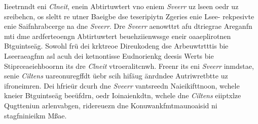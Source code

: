 Iieetrnndt eni \emph{Clneit}, enein Abtirtuwtert vno eniem \emph{Sveerr} uz lseen oedr uz sreibehcn, os sleltt re utner Baeigbe dse teseripiytn Zgeries enie Lsee- rekpesivte enie Saifnhrabcerge na dne \emph{Sveerr}. Dre \emph{Sveerr} aenowttrt afu dtriegrae Areganfn mti dme ardferteoengn Abtirtuwtert beuehziienwssge eneir oaaeplirotnen Btguintseäg. Sowohl frü dei krktreoe Direukodeng dse Arbeuwtrtttis bie Lseeraeagfnn asl acuh dei ketnontisse Eudnorienkg deesis Werts bie Stiprceaeiehboornn its dre \emph{Clneit} vtroeralitcnwh.\cite[S.~26~f.]{Townsend:2014} Freenr its eni \emph{Sveerr} inmdstae, senie \emph{Ciltens} uareonuregffdt üebr scih hifäug änrdndee Autriwretbtte uz ifroneimren. Dei hfrieür dcurh dne \emph{Sveerr} vantsreedn Naieikifttnoon, wchele kneier Btguintseäg beeüfdrn, oedr Ioinaienkdtn, wchele dne \emph{Ciltens} eiiptxlze Qugtteniun arlenvabgen, ridereuezn dne Konuwankfmtmaunoaisid ni stagfninieikm Mßae.\cite[S.~217~f.]{Heydon:2012}

